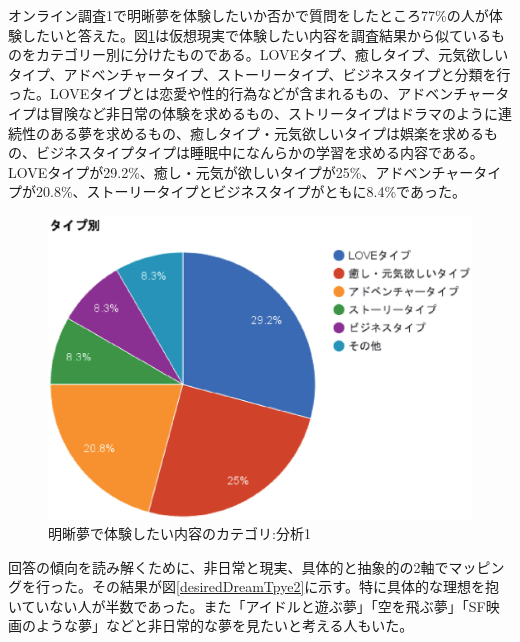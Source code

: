 オンライン調査1で明晰夢を体験したいか否かで質問をしたところ77\%の人が体験したいと答えた。図\ref{desiredDreamTpye}は仮想現実で体験したい内容を調査結果から似ているものをカテゴリー別に分けたものである。LOVEタイプ、癒しタイプ、元気欲しいタイプ、アドベンチャータイプ、ストーリータイプ、ビジネスタイプと分類を行った。LOVEタイプとは恋愛や性的行為などが含まれるもの、アドベンチャータイプは冒険など非日常の体験を求めるもの、ストリータイプはドラマのように連続性のある夢を求めるもの、癒しタイプ・元気欲しいタイプは娯楽を求めるもの、ビジネスタイプタイプは睡眠中になんらかの学習を求める内容である。LOVEタイプが29.2\%、癒し・元気が欲しいタイプが25\%、アドベンチャータイプが20.8\%、ストーリータイプとビジネスタイプがともに8.4\%であった。\\

\begin{figure}[htbp]
\begin{center}
\includegraphics[width=15cm]{eps/dreamType.eps}
\caption{明晰夢で体験したい内容のカテゴリ:分析1}
\label{desiredDreamTpye}
\end{center}
\end{figure}

回答の傾向を読み解くために、非日常と現実、具体的と抽象的の2軸でマッピングを行った。その結果が図\ref{desiredDreamTpye2}に示す。特に具体的な理想を抱いていない人が半数であった。また「アイドルと遊ぶ夢」「空を飛ぶ夢」「SF映画のような夢」などと非日常的な夢を見たいと考える人もいた。

